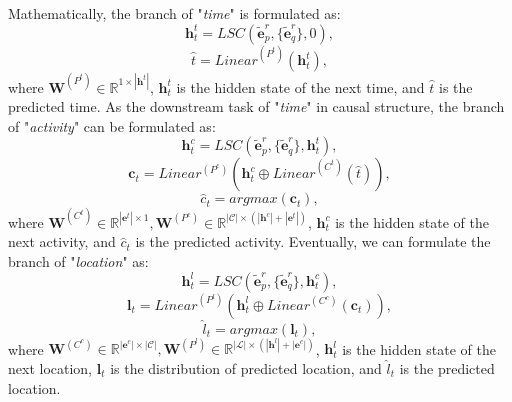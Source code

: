 \documentclass[sigconf]{acmart}
\begin{document}
    Mathematically, the branch of "\textit{time}" is formulated as:
    \begin{equation}
        \boldsymbol{h}^t_t = LSC(\widetilde{\boldsymbol{e}}^r_p, \{\widetilde{\boldsymbol{e}}^r_q\}, 0),
    \end{equation}
    \begin{equation}
        \hat{t} = Linear^{(P^t)}(\boldsymbol{h}^t_t),
    \end{equation}
    where $\boldsymbol{W}^{(P^t)}\in\mathbb{R}^{1\times|\boldsymbol{h}^t|}$, $\boldsymbol{h}^t_t$ is the hidden state of the next time, and $\hat{t}$ is the predicted time.
    As the downstream task of "\textit{time}" in causal structure, the branch of "\textit{activity}" can be formulated as:
    \begin{equation}
        \boldsymbol{h}^c_t = LSC(\widetilde{\boldsymbol{e}}^r_p, \{\widetilde{\boldsymbol{e}}^r_q\}, \boldsymbol{h}^t_t),
    \end{equation}
    \begin{equation}
        \boldsymbol{c}_t = Linear^{(P^c)}(\boldsymbol{h}^c_t \oplus Linear^{(C^t)}(\hat{t})),
    \end{equation}
    \begin{equation}
        \hat{c}_t = argmax(\boldsymbol{c}_t),
    \end{equation}
    where $ \boldsymbol{W}^{(C^t)}\in\mathbb{R}^{|\boldsymbol{e}^t|\times1}, \boldsymbol{W}^{(P^c)}\in\mathbb{R}^{|\mathcal{C}|\times(|\boldsymbol{h}^c|+|\boldsymbol{e}^t|)}$, $\boldsymbol{h}^c_t$ is the hidden state of the next activity, and $\hat{c}_t$ is the predicted activity.
    Eventually, we can formulate the branch of "\textit{location}" as:
    \begin{equation}
        \boldsymbol{h}^l_t = LSC(\widetilde{\boldsymbol{e}}^r_p, \{\widetilde{\boldsymbol{e}}^r_q\}, \boldsymbol{h}^c_t),
    \end{equation}
    \begin{equation}
        \boldsymbol{l}_t = Linear^{(P^l)}(\boldsymbol{h}^l_t \oplus Linear^{(C^c)}(\boldsymbol{c}_t)),
    \end{equation}
    \begin{equation}
        \hat{l}_t = argmax(\boldsymbol{l}_t),
    \end{equation}
    where $ \boldsymbol{W}^{(C^c)}\in\mathbb{R}^{|\boldsymbol{e}^c|\times|\mathcal{C}|}, \boldsymbol{W}^{(P^l)}\in\mathbb{R}^{|\mathcal{L}|\times(|\boldsymbol{h}^l|+|\boldsymbol{e}^c|)}$, $\boldsymbol{h}^l_t$ is the hidden state of the next location, $\boldsymbol{l}_t$ is the distribution of predicted location, and $\hat{l}_t$ is the predicted location.
    
\end{document}
